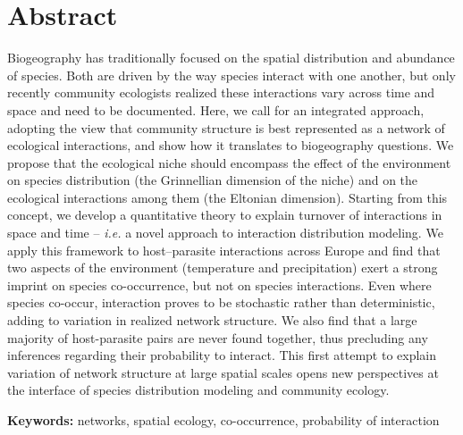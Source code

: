 \documentclass[12pt]{article}
\begin{document}


\doublespacing

\section*{Abstract}

Biogeography has traditionally focused on the spatial distribution and
abundance of species. Both are driven by the way species interact with one
another, but only recently community ecologists realized these interactions 
vary across time and space and need to be documented.
Here, we call for an integrated approach, adopting the view that community
structure is best represented as a network of ecological interactions, and
show how it translates to biogeography questions. We propose that the
ecological niche should encompass the effect of the environment
on species distribution (the Grinnellian dimension of the niche) and on the
ecological interactions among them (the Eltonian dimension). Starting from
this concept, we develop a quantitative theory to explain turnover of
interactions in space and time -- \emph{i.e.} a novel approach to interaction
distribution modeling. We apply this framework to host–parasite interactions
across Europe and find that two aspects of the environment (temperature and
precipitation) exert a strong imprint on species co-occurrence, but not on
species interactions. Even where species co-occur, interaction proves to be
stochastic rather than deterministic, adding to variation in realized network
structure. We also find that a large majority of host-parasite pairs are never
found together, thus precluding any inferences regarding their probability to
interact. This first attempt to explain variation of network structure at
large spatial scales opens new perspectives at the interface of species
distribution modeling and community ecology.

\textbf{Keywords:} networks, spatial ecology, co-occurrence, probability of interaction\\
\end{document}
